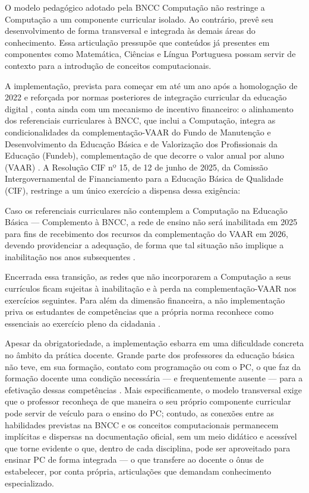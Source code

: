 O modelo pedagógico adotado pela BNCC Computação não restringe a Computação a um componente curricular isolado. Ao contrário, prevê seu desenvolvimento de forma transversal e integrada às demais áreas do conhecimento. Essa articulação pressupõe que conteúdos já presentes em componentes como Matemática, Ciências e Língua Portuguesa possam servir de contexto para a introdução de conceitos computacionais.

A implementação, prevista para começar em até um ano após a homologação de 2022 \cite{brasil2022computacao} e reforçada por normas posteriores de integração curricular da educação digital \cite{brasil2025cne}, conta ainda com um mecanismo de incentivo financeiro: o alinhamento dos referenciais curriculares à BNCC, que inclui a Computação, integra as condicionalidades da complementação-VAAR do Fundo de Manutenção e Desenvolvimento da Educação Básica e de Valorização dos Profissionais da Educação (Fundeb), complementação de que decorre o valor anual por aluno (VAAR) \cite{brasil2020fundeb}. A Resolução CIF nº 15, de 12 de junho de 2025, da Comissão Intergovernamental de Financiamento para a Educação Básica de Qualidade (CIF), restringe a um único exercício a dispensa dessa exigência:

\begin{citacao}
Caso os referenciais curriculares não contemplem a Computação na Educação Básica --- Complemento à BNCC, a rede de ensino não será inabilitada em 2025 para fins de recebimento dos recursos da complementação do VAAR em 2026, devendo providenciar a adequação, de forma que tal situação não implique a inabilitação nos anos subsequentes \cite[art.~4º, §~3º]{brasil2025cif}.
\end{citacao}

\noindent Encerrada essa transição, as redes que não incorporarem a Computação a seus currículos ficam sujeitas à inabilitação e à perda na complementação-VAAR nos exercícios seguintes. Para além da dimensão financeira, a não implementação priva os estudantes de competências que a própria norma reconhece como essenciais ao exercício pleno da cidadania \cite{brasil2022parecer}.

Apesar da obrigatoriedade, a implementação esbarra em uma dificuldade concreta no âmbito da prática docente. Grande parte dos professores da educação básica não teve, em sua formação, contato com programação ou com o PC, o que faz da formação docente uma condição necessária --- e frequentemente ausente --- para a efetivação dessas competências \cite{boeres2024}. Mais especificamente, o modelo transversal exige que o professor reconheça de que maneira o seu próprio componente curricular pode servir de veículo para o ensino do PC; contudo, as conexões entre as habilidades previstas na BNCC e os conceitos computacionais permanecem implícitas e dispersas na documentação oficial, sem um meio didático e acessível que torne evidente o que, dentro de cada disciplina, pode ser aproveitado para ensinar PC de forma integrada --- o que transfere ao docente o ônus de estabelecer, por conta própria, articulações que demandam conhecimento especializado.

